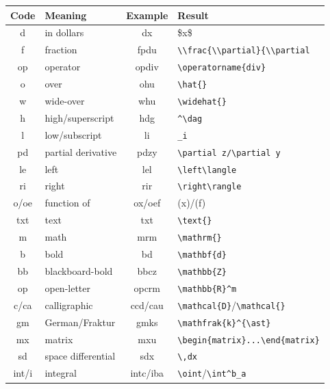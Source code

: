 \documentclass[11pt]{article}
\begin{document}
\begin{table}[tbh]
\begin{center}
  \begin{tabular}{>{\ttfamily}cl>{\ttfamily}c>{\ttfamily}l}
  \toprule
    \textnormal{Code} & Meaning & \textnormal{Example} & \textnormal{Result} \\
  \midrule
    d & in dollars        & dx{}    & \$x\$ \\
    f & fraction          & fpdu{}  & \verb.\\frac{\\partial}{\\partial. \\
    op& operator          & opdiv{} & \verb.\operatorname{div}. \\
    o & over              & ohu{}   & \verb.\hat{}. \\
    w & wide-over         & whu{}   & \verb.\widehat{}. \\
    h & high/superscript{}& hdg{}   & \verb.^\dag. \\
    l & low/subscript{}   & li{}    & \verb._i. \\
    pd& partial derivative& pdzy{}  & \verb.\partial z/\partial y. \\
    le& left              & lel{}   & \verb.\left\langle. \\
    ri& right             & rir{}   & \verb.\right\rangle. \\
  o/oe& function of       & ox/oef{}& (x)/(f) \\
   txt& text              & txt{}   & \verb.\text{}. \\
    m & math              & mrm{}   & \verb.\mathrm{}. \\
    b & bold{}            & bd{}    & \verb.\mathbf{d}. \\
    bb& blackboard-bold{} & bbcz{}  & \verb.\mathbb{Z}. \\
    op& open-letter       & opcrm{} & \verb.\mathbb{R}^m. \\
  c/ca& calligraphic      & ccd/cau{}   & \verb.\mathcal{D}./\verb.\mathcal{}. \\
    gm& German/Fraktur    & gmks{}  & \verb.\mathfrak{k}^{\ast}. \\
    mx& matrix            & mxu{}   & \verb'\begin{matrix}...\end{matrix}' \\
    sd& space differential& sdx{}   & \verb.\,dx. \\
 int/i& integral        & intc/iba{}& \verb.\oint./\verb.\int^b_a. \\

\end{tabular}
\end{center}
\end{table}
\end{document}
